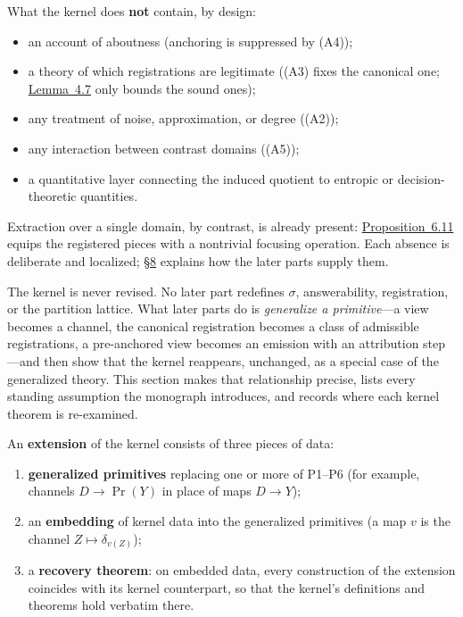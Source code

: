 What the kernel does \textbf{not} contain, by design:

\begin{itemize}
\tightlist
\item
  an account of aboutness (anchoring is suppressed by (A4));
\item
  a theory of which registrations are legitimate ((A3) fixes the canonical one; \hyperlink{stmt:4.7}{Lemma~4.7} only bounds the sound ones);
\item
  any treatment of noise, approximation, or degree ((A2));
\item
  any interaction between contrast domains ((A5));
\item
  a quantitative layer connecting the induced quotient to entropic or decision-theoretic quantities.
\end{itemize}

Extraction over a single domain, by contrast, is already present: \hyperlink{stmt:6.11}{Proposition~6.11} equips the registered pieces with a nontrivial focusing operation. Each absence is deliberate and localized; \hyperlink{sec:8}{§8} explains how the later parts supply them.


The kernel is never revised. No later part redefines \(\sigma\), answerability, registration, or the partition lattice. What later parts do is \emph{generalize a primitive}---\hspace{0pt}a view becomes a channel, the canonical registration becomes a class of admissible registrations, a pre-anchored view becomes an emission with an attribution step---\hspace{0pt}and then show that the kernel reappears, unchanged, as a special case of the generalized theory. This section makes that relationship precise, lists every standing assumption the monograph introduces, and records where each kernel theorem is re-examined.


An \textbf{extension} of the kernel consists of three pieces of data:

\begin{enumerate}
\def\labelenumi{\arabic{enumi}.}
\tightlist
\item
  \textbf{generalized primitives} replacing one or more of P1--P6 (for example, channels \(D \to \Pr(Y)\) in place of maps \(D \to Y\));
\item
  an \textbf{embedding} of kernel data into the generalized primitives (a map \(v\) is the channel \(Z \mapsto \delta_{v(Z)}\));
\item
  a \textbf{recovery theorem}: on embedded data, every construction of the extension coincides with its kernel counterpart, so that the kernel's definitions and theorems hold verbatim there.
\end{enumerate}

